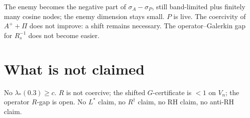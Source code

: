\documentclass[11pt]{article}
\theoremstyle{remark}
\begin{document}
The enemy becomes the negative part of
$\sigma_A-\sigma_P$, still band-limited plus
finitely many cosine nodes; the enemy dimension
stays small.  $P$ is live.  The coercivity of
$A^++\Pi$ does not improve: a shift remains
necessary.  The operator--Galerkin gap for $R_s^{-1}$
does not become easier.

\section{What is not claimed}

No $\lambda_*(0.3)\ge c$.
$R$ is not coercive; the shifted $G$-certificate
is $<1$ on $V_n$; the operator $R$-gap is open.
No $L^*$ claim, no $R^\dagger$ claim, no RH claim,
no anti-RH claim.
\end{document}
